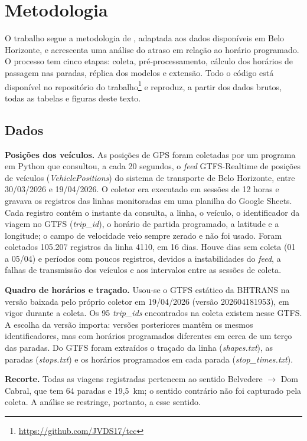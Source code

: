 \section{Metodologia}
\label{sec:metodologia}

O trabalho segue a metodologia de \cite{courb}, adaptada aos dados
disponíveis em Belo Horizonte, e acrescenta uma análise do atraso em relação ao horário
programado. O processo tem cinco etapas: coleta, pré-processamento, cálculo dos horários de
passagem nas paradas, réplica dos modelos e extensão. Todo o código está disponível no
repositório do trabalho\footnote{\url{https://github.com/JVDS17/tcc}} e reproduz, a partir dos
dados brutos, todas as tabelas e figuras deste texto.

\subsection{Dados}

\textbf{Posições dos veículos.} As posições de GPS foram coletadas por um programa em Python
que consultou, a cada 20 segundos, o \textit{feed} GTFS-Realtime de posições de veículos
(\textit{VehiclePositions}) do sistema de transporte de Belo Horizonte, entre 30/03/2026 e
19/04/2026. O coletor era executado em sessões de 12 horas e gravava os registros das linhas
monitoradas em uma planilha do Google Sheets. Cada registro contém o instante da consulta, a
linha, o veículo, o identificador da viagem no GTFS (\textit{trip\_id}), o horário de partida
programado, a latitude e a longitude; o campo de velocidade veio sempre zerado e não foi
usado. Foram coletados 105.207 registros da linha 4110, em 16 dias. Houve dias sem coleta (01
a 05/04) e períodos com poucos registros, devidos a instabilidades do \textit{feed}, a falhas
de transmissão dos veículos e aos intervalos entre as sessões de coleta.

\textbf{Quadro de horários e traçado.} Usou-se o GTFS estático da BHTRANS \cite{gtfsbh} na
versão baixada pelo próprio coletor em 19/04/2026 (versão 202604181953), em vigor durante a
coleta. Os 95 \textit{trip\_ids} encontrados na coleta existem nesse GTFS. A escolha da versão
importa: versões posteriores mantêm os mesmos identificadores, mas com horários programados
diferentes em cerca de um terço das paradas. Do GTFS foram extraídos o traçado da linha
(\textit{shapes.txt}), as paradas (\textit{stops.txt}) e os horários programados em cada
parada (\textit{stop\_times.txt}).

\textbf{Recorte.} Todas as viagens registradas pertencem ao sentido Belvedere $\rightarrow$
Dom Cabral, que tem 64 paradas e 19,5~km; o sentido contrário não foi capturado pela coleta.
A análise se restringe, portanto, a esse sentido.

